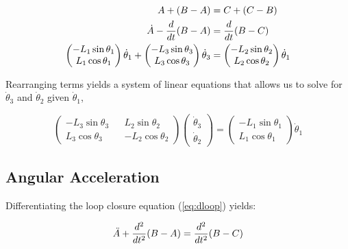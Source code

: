 \documentclass[letterpaper]{article}
\begin{document}
\begin{align}
	A + (B - A) &= C + (C - B) \notag \\
	\dot{A} - \frac{d}{dt} (B - A) &= \frac{d}{dt} ( B - C) \label{eq:dloop}\\
	\begin{pmatrix} -L_1 \sin \theta_1 \\ L_1 \cos \theta_1 \end{pmatrix} \dot{\theta}_1 + \begin{pmatrix} -L_3 \sin \theta_3 \\ L_3 \cos \theta_3 \end{pmatrix} \dot{\theta}_3 &= \begin{pmatrix} -L_2 \sin \theta_2 \\ L_2 \cos \theta_2 \end{pmatrix} \dot{\theta}_1 \notag
	\end{align}

\noindent Rearranging terms yields a system of linear equations that allows us to solve for $\dot{\theta}_3$ and $\dot{\theta}_2$ given $\dot{\theta}_1$,

\begin{equation}
	\begin{pmatrix} -L_3 \sin \theta_3 && L_2 \sin \theta_2 \\ L_3 \cos \theta_3 && - L_2 \cos \theta_2 \end{pmatrix} \begin{pmatrix} \dot{\theta}_3 \\ \dot{\theta}_2 \end{pmatrix} = \begin{pmatrix} -L_1 \sin \theta_1 \\ L_1 \cos \theta_1 \end{pmatrix} \dot{\theta}_1
\end{equation}

\subsection{Angular Acceleration}

Differentiating the loop closure equation (\ref{eq:dloop}) yields:

\begin{equation}
	\ddot{A} + \frac{d^2}{dt^2} (B -A) = \frac{d^2}{dt^2} (B - C) \\
\end{equation}
\end{document}
